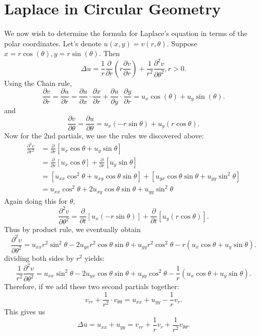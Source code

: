 \documentclass[class=article,crop=false]{standalone}
\begin{document}
\newpage
\section{Laplace in Circular Geometry}

We now wish to determine the formula for Laplace's equation in terms of the polar coordinates. Let's denote $ u(x,y)=v(r, \theta)$. Suppose $ x=r \cos(\theta ), y=r \sin(\theta )$. Then
\[
	\Delta u = \frac{1}{r} \frac{\partial }{\partial r} \left(r \frac{\partial v}{\partial r} \right) + \frac{1}{r^2} \frac{\partial^2 v}{\partial { \theta}^2}, r>0
.\] 
Using the Chain rule,
\[
\frac{\partial v}{\partial r} = \frac{\partial u}{\partial r} = \frac{\partial u}{\partial x} \cdot \frac{\partial x}{\partial r} + \frac{\partial u}{\partial y} \cdot \frac{\partial y}{\partial r} = u_x \cos(\theta ) + u_y \sin(\theta )
.\] 
and
\[
	\frac{\partial v}{\partial \theta} = \frac{\partial u}{\partial \theta} = u_x(-r \sin\theta) + u_y(r \cos\theta)  
.\] 
Now for the 2nd partials, we use the rules we discovered above:
\begin{align*}
	\frac{\partial^2 v}{\partial { r}^2} &= \frac{\partial }{\partial r} [u_x \cos\theta + u_y \sin\theta] \\
					     &= \frac{\partial }{\partial r} [u_x \cos\theta] + \frac{\partial }{\partial r} [u_y \sin\theta] \\
					     &= [u_{x x}\cos^2\theta + u_{xy} \cos \theta \sin\theta ]+ [u_{yx} \cos\theta \sin\theta + u_{yy}\sin^2\theta] \\
					     &= u_{x x} \cos^2\theta + 2u_{xy}\cos\theta \sin\theta + u_{yy} \sin^2\theta 
\end{align*}
Again doing this for $ \theta$,
\[
	\frac{\partial^2 v}{\partial { \theta}^2} = \frac{\partial }{\partial t} [u_x (-r \sin\theta)] + \frac{\partial }{\partial t} [u_y (r\cos\theta)]
.\] 
Thus by product rule, we eventually obtain
\[
	\frac{\partial^2 v}{\partial { \theta}^2} = u_{x x} r^2 \sin^2\theta - 2u_{yx}r^2 \cos\theta\sin\theta + u_{yy} r^2 \cos^2\theta - r(u_x \cos\theta+ u_y \sin\theta)
.\] 
dividing both sides by $ r^2$ yields:
\[	\frac{1}{r^2} \frac{\partial^2 v}{\partial { \theta}^2} = u_{x x} \sin^2\theta - 2u_{yx} \cos\theta\sin\theta + u_{yy} \cos^2\theta - \frac{1}{r} (u_x \cos\theta+ u_y \sin\theta)
.\]
Therefore, if we add these two second partials together:
\[
v_{rr} + \frac{1}{r^2} \cdot v_{\theta \theta} = u_{x x} + u_{yy} - \frac{1}{r}v_r
.\] 
This gives us
\[
\Delta u = u_{x x}+ u_{yy} = v_{rr} + \frac{1}{r}v_r + \frac{1}{r^2} v_{\theta \theta}
.\] 
\end{document}
